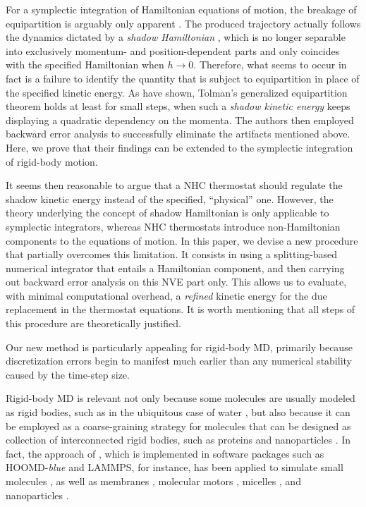 \documentclass[
journal=jctcce,
layout=twocolumn
]{achemso}
\newcommand{\timestep}{h}
\begin{document}
For a symplectic integration of Hamiltonian equations of motion, the breakage of equipartition is arguably only apparent \cite{Eastwood_2010}.
The produced trajectory actually follows the dynamics dictated by a \textit{shadow Hamiltonian} \cite{Tuckerman_2010}, which is no longer separable into exclusively momentum- and position-dependent parts and only coincides with the specified Hamiltonian when $\timestep \to 0$.
Therefore, what seems to occur in fact is a failure to identify the quantity that is subject to equipartition in place of the specified kinetic energy.
As \citeauthor{Eastwood_2010} \cite{Eastwood_2010} have shown, Tolman's generalized equipartition theorem \cite{Tolman_1918, Uline_2008} holds at least for small steps, when such a \textit{shadow kinetic energy} keeps displaying a quadratic dependency on the momenta.
The authors then employed backward error analysis to successfully eliminate the artifacts mentioned above.
Here, we prove that their findings can be extended to the symplectic integration of rigid-body motion.

It seems then reasonable to argue that a NHC thermostat should regulate the shadow kinetic energy instead of the specified, ``physical'' one.
However, the theory underlying the concept of shadow Hamiltonian is only applicable to symplectic integrators, whereas NHC thermostats introduce non-Hamiltonian components to the equations of motion.
In this paper, we devise a new procedure that partially overcomes this limitation.
It consists in using a splitting-based numerical integrator that entails a Hamiltonian component, and then carrying out backward error analysis on this NVE part only.
This allows us to evaluate, with minimal computational overhead, a \textit{refined} kinetic energy for the due replacement in the thermostat equations.
It is worth mentioning that all steps of this procedure are theoretically justified.

Our new method is particularly appealing for rigid-body MD, primarily because discretization errors begin to manifest much earlier than any numerical stability caused by the time-step size. 



Rigid-body MD is relevant not only because some molecules are usually modeled as rigid bodies, such as in the ubiquitous case of water \cite{Jorgensen_1983}, but also because it can be employed as a coarse-graining strategy for molecules that can be designed as collection of interconnected rigid bodies, such as proteins and nanoparticles \cite{Knorowski_2012, Patra_2013}.
In fact, the approach of \citeauthor{Kamberaj_2005} \cite{Kamberaj_2005}, which is implemented in software packages such as HOOMD-\textit{blue}\cite{Anderson_2008} and LAMMPS\cite{Plimpton_1995}, for instance, has been applied to simulate small molecules \cite{Geiger_2013, Aimoli_2014, Aimoli_2014_2}, as well as membranes \cite{Bucior_2012}, molecular motors \cite{Akimov_2012}, micelles \cite{Yan_2008}, and nanoparticles \cite{Patra_2014}.
\end{document}
